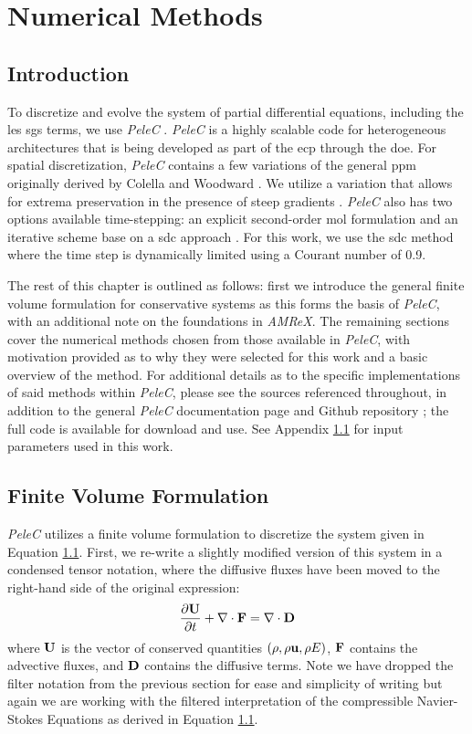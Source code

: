 \chapter{Numerical Methods}
\section{Introduction}
To discretize and evolve the system of partial differential equations, including the \gls{les} \gls{sgs} terms, we use \textit{PeleC} \cite{PeleC1, PeleC2}. \textit{PeleC} is a highly scalable code for heterogeneous architectures that is being developed as part of the \gls{ecp} through the \gls{doe}. For spatial discretization, \textit{PeleC} contains a few variations of the general \gls{ppm} originally derived by Colella and Woodward \cite{1984JCoPPPM}. We utilize a variation that allows for extrema preservation in the presence of steep gradients \cite{MILLER200226, COLELLA20087069}. \textit{PeleC} also has two options available time-stepping: an explicit second-order \gls{mol} formulation and an iterative scheme base on a \gls{sdc} approach \cite{}. For this work, we use the \gls{sdc} method where the time step is dynamically limited using a Courant number of 0.9. 

The rest of this chapter is outlined as follows: first we introduce the general finite volume formulation for conservative systems as this forms the basis of \textit{PeleC}, with an additional note on the foundations in \textit{AMReX}. The remaining sections cover the numerical methods chosen from those available in \textit{PeleC}, with motivation provided as to why they were selected for this work and a basic overview of the method. For additional details as to the specific implementations of said methods within \textit{PeleC}, please see the sources referenced throughout, in addition to the general \textit{PeleC} documentation page \cite{} and Github repository \cite{}; the full code is available for download and use. See Appendix \ref{} for input parameters used in this work.  

\section{Finite Volume Formulation} \label{FVM_section}
\textit{PeleC} utilizes a finite volume formulation \cite{} to discretize the system given in Equation \ref{}. First, we re-write a slightly modified version of this system in a condensed tensor notation, where the diffusive fluxes have been moved to the right-hand side of the original expression: 
\begin{equation} \label{NSE_tensor}
\dfrac{\partial \vb{U}}{\partial t} + \nabla \cdot \vb{F} = \nabla \cdot \vb{D}
\end{equation}
where $\vb{U}$ is the vector of conserved quantities $(\rho, \rho \vb{u}, \rho E)$, $\vb{F}$ contains the advective fluxes, and $\vb{D}$ contains the diffusive terms. Note we have dropped the filter notation from the previous section for ease and simplicity of writing but again we are working with the filtered interpretation of the compressible Navier-Stokes Equations as derived in Equation \ref{}. 

